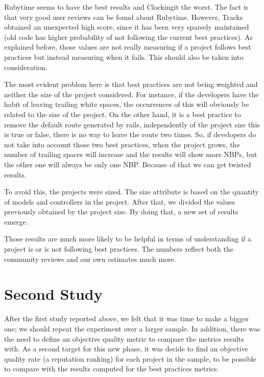 Rubytime seems to have the best results and Clockingit the worst. 
The fact is that very good user reviews can be found about Rubytime.
However, Tracks obtained an unexpected high score, since it has been very sparsely maintained 
(old code has higher probability of not following the current best practices).
As explained before, those values are not really measuring if a project follows best practices 
but instead measuring when it fails.
This should also be taken into consideration. 

The most evident problem here is that best practices are not being weighted and neither the size of the project considered.
For instance, if the developers have the habit of leaving trailing white spaces, 
the occurrences of this will obviously be related to the size of the project.
On the other hand, it is a best practice to remove the default route generated by rails, 
independently of the project size this is true or false, there is no way to leave the route two times. 
So, if developers do not take into account those two best practices, when the project grows, 
the number of trailing spaces will increase and the results will show more NBPs, 
but the other one will always be only one NBP.  
Because of that we can get twisted results.

To avoid this, the projects were sized.
The size attribute is based on the quantity of models and controllers in the project.
After that, we divided the values previously obtained  by the project size.
By doing that, a new set of results emerge.



Those results are much more likely to be helpful in terms of understanding if a project is or is not following 
best practices.
The numbers reflect both the community reviews and our own estimates much more.


\section{Second Study}\label{subsec:second_study}
After the first study reported above, we felt that it was time to make a bigger one;
we should repeat the experiment over a larger sample. 
In addition, there was the need to define an objective quality metric to compare the metrics results with.
As a second target for this new phase, it was decide to find an objective quality rate (a reputation ranking) for each project in the sample, 
to be possible to compare with the results computed for the best practices metrics.

